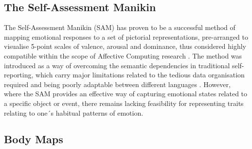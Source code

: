 \subsection*{The Self-Assessment Manikin}

The Self-Assessment Manikin (SAM) has proven to be a successful method of mapping emotional responses to a set of pictorial representations, pre-arranged to visualise 5-point scales of valence, arousal and dominance, thus considered highly compatible within the scope of Affective Computing research \cite{broekens_affectbutton_2013,zeigler-hill_self-assessment_2017}. The method was introduced as a way of overcoming the semantic dependencies in traditional self-reporting, which carry major limitations related to the tedious data organisation required and being poorly adaptable between different languages \cite{zeigler-hill_self-assessment_2017}. However, where the SAM provides an effective way of capturing emotional states related to a specific object or event, there remains lacking feasibility for representing traits relating to one´s habitual patterns of emotion.

\subsection*{Body Maps}

